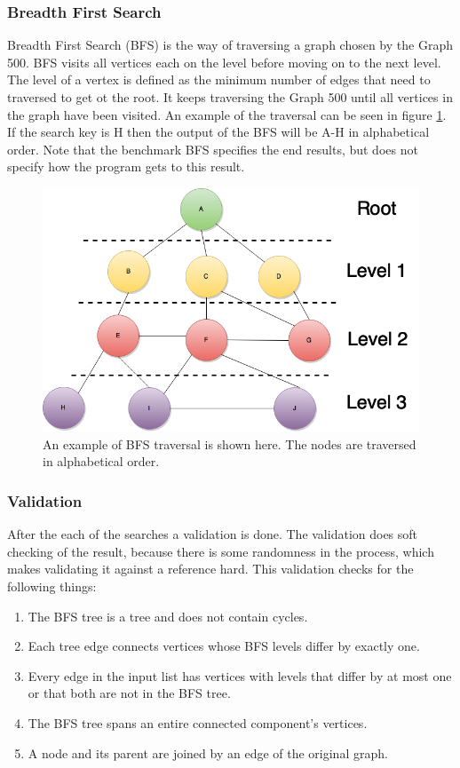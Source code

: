 \subsubsection{Breadth First Search}
Breadth First Search\cite{bfs} (BFS) is the way of traversing a graph chosen by the Graph 500. BFS visits all vertices each on the level before moving on to the next level. The level of a vertex is defined as the minimum number of edges that need to traversed to get ot the root. It keeps traversing the Graph 500 until all vertices in the graph have been visited. An example of the traversal can be seen in figure \ref{fig:bfs}. If the search key is H then the output of the BFS will be A-H in alphabetical order.
Note that the benchmark  BFS  specifies the end results, but does not specify how the program gets to this result.
\begin{figure}[!h]
	\includegraphics[width=\textwidth]{images/BFS-example1-with-levels}
	\caption{An example of BFS traversal is shown here. The nodes are traversed in alphabetical order.}
	\label{fig:bfs}
\end{figure}

\subsubsection{Validation}
After the each of the searches a validation is done. The validation does soft checking of the result, because there is some randomness in the process, which makes validating it against a reference hard. This validation checks for the following things:
\begin{enumerate}
\item The BFS tree is a tree and does not contain cycles.
\item Each tree edge connects vertices whose BFS levels differ by exactly one.
\item Every edge in the input list has vertices with levels that differ by at most one or that both are not in the BFS tree.
\item The BFS tree spans an entire connected component's vertices.
\item A node and its parent are joined by an edge of the original graph.
\end{enumerate}


